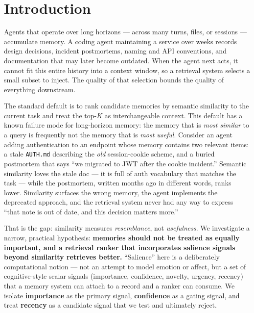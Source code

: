 \documentclass[11pt]{article}
\begin{document}
\section{Introduction}

Agents that operate over long horizons --- across many turns, files, or sessions ---
accumulate memory. A coding agent maintaining a service over weeks records design
decisions, incident postmortems, naming and API conventions, and documentation that may
later become outdated. When the agent next acts, it cannot fit this entire history into a
context window, so a retrieval system selects a small subset to inject. The quality of
that selection bounds the quality of everything downstream.

The standard default is to rank candidate memories by semantic similarity to the current
task and treat the top-$K$ as interchangeable context. This default has a known failure
mode for long-horizon memory: the memory that is \emph{most similar} to a query is
frequently not the memory that is \emph{most useful}. Consider an agent adding
authentication to an endpoint whose memory contains two relevant items: a stale
\texttt{AUTH.md} describing the \emph{old} session-cookie scheme, and a buried postmortem
that says ``we migrated to JWT after the cookie incident.'' Semantic similarity loves the
stale doc --- it is full of auth vocabulary that matches the task --- while the
postmortem, written months ago in different words, ranks lower. Similarity surfaces the
wrong memory, the agent implements the deprecated approach, and the retrieval system never
had any way to express ``that note is out of date, and this decision matters more.''

That is the gap: similarity measures \emph{resemblance}, not \emph{usefulness}. We
investigate a narrow, practical hypothesis: \textbf{memories should not be treated as
equally important, and a retrieval ranker that incorporates salience signals beyond
similarity retrieves better.} ``Salience'' here is a deliberately computational notion ---
not an attempt to model emotion or affect, but a set of cognitive-style scalar signals
(importance, confidence, novelty, urgency, recency) that a memory system can attach to a
record and a ranker can consume. We isolate \textbf{importance} as the primary signal,
\textbf{confidence} as a gating signal, and treat \textbf{recency} as a candidate signal
that we test and ultimately reject.
\end{document}
